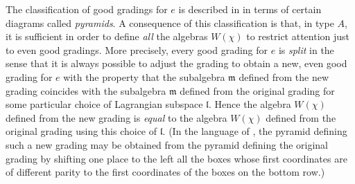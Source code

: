 \documentclass[twoside,12pt,reqno]{amsart}
\def\elly{\mathfrak{l}}
\begin{document}
The classification of good gradings for $e$
is described in \cite[Theorem 4.2]{EK} in terms of certain 
diagrams called {\em pyramids}. A consequence
of this classification is that, in type $A$, 
it is sufficient in order to define {\em all} the algebras
$W(\chi)$ to restrict attention just to {even good gradings}.
More precisely, 
every good grading for $e$ is {\em split} in the sense that 
it is always possible to adjust the grading
to obtain a new, even good grading for $e$ with the property that 
the subalgebra $\mathfrak{m}$ defined from the new grading
coincides with the subalgebra $\mathfrak{m}$ defined from the
original grading for some particular choice of Lagrangian subspace
$\elly$. Hence the algebra $W(\chi)$ defined from the new
grading is {\em equal} to the algebra $W(\chi)$ 
defined from the original grading using this choice of $\elly$. 
(In the language of \cite[$\S$4]{EK}, the pyramid defining
such a new 
grading may be obtained from the pyramid defining
the original grading by shifting one place to the left
all the boxes whose first coordinates
are of different parity to the first coordinates of 
the boxes on the bottom row.)
\end{document}
